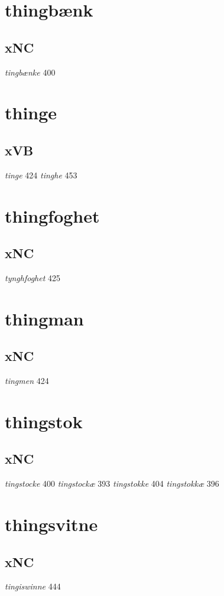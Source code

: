 \documentclass[a4paper,twocolumn]{article}
\begin{document}
\section{thingbænk}
\label{sec:org3145ed2}
\subsection{xNC}
\label{sec:org80d5ae3}
\emph{tingbænke} 400 
\section{thinge}
\label{sec:org470ab6a}
\subsection{xVB}
\label{sec:orgd15df61}
\emph{tinge} 424 \emph{tinghe} 453 
\section{thingfoghet}
\label{sec:org0ac76d4}
\subsection{xNC}
\label{sec:org752771f}
\emph{tynghfoghet} 425 
\section{thingman}
\label{sec:org334c75d}
\subsection{xNC}
\label{sec:org3c08bc0}
\emph{tingmen} 424 
\section{thingstok}
\label{sec:orgef225c0}
\subsection{xNC}
\label{sec:org94f2b38}
\emph{tingstocke} 400 \emph{tingstockæ} 393 \emph{tingstokke} 404 \emph{tingstokkæ} 396 
\section{thingsvitne}
\label{sec:orgdc22186}
\subsection{xNC}
\label{sec:org7c72d03}
\emph{tingiswinne} 444 
\end{document}
